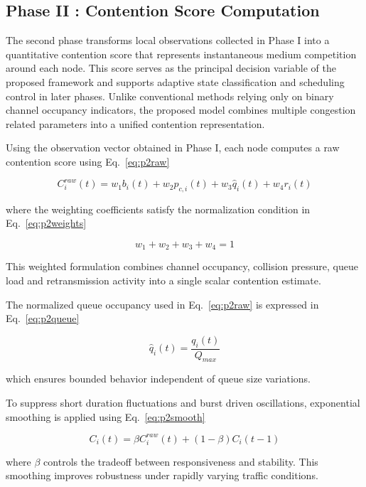 \documentclass[a4paper,fleqn,final,1p]{cas-dc}
\numberwithin{equation}{section}
\begin{document}
\subsection{Phase II : Contention Score Computation}

The second phase transforms local observations collected in Phase I into a quantitative contention score that represents instantaneous medium competition around each node. This score serves as the principal decision variable of the proposed framework and supports adaptive state classification and scheduling control in later phases. Unlike conventional methods relying only on binary channel occupancy indicators, the proposed model combines multiple congestion related parameters into a unified contention representation.

Using the observation vector obtained in Phase I, each node computes a raw contention score using Eq.~\ref{eq:p2raw}

\begin{equation}
C_i^{raw}(t)=
w_1 b_i(t)+
w_2 p_{c,i}(t)+
w_3 \hat q_i(t)+
w_4 r_i(t)
\label{eq:p2raw}
\end{equation}

where the weighting coefficients satisfy the normalization condition in Eq.~\ref{eq:p2weights}

\begin{equation}
w_1+w_2+w_3+w_4=1
\label{eq:p2weights}
\end{equation}

This weighted formulation combines channel occupancy, collision pressure, queue load and retransmission activity into a single scalar contention estimate.

The normalized queue occupancy used in Eq.~\ref{eq:p2raw} is expressed in Eq.~\ref{eq:p2queue}

\begin{equation}
\hat q_i(t)=
\frac{q_i(t)}{Q_{max}}
\label{eq:p2queue}
\end{equation}

which ensures bounded behavior independent of queue size variations.

To suppress short duration fluctuations and burst driven oscillations, exponential smoothing is applied using Eq.~\ref{eq:p2smooth}

\begin{equation}
C_i(t)=
\beta C_i^{raw}(t)
+
(1-\beta)C_i(t-1)
\label{eq:p2smooth}
\end{equation}

where $\beta$ controls the tradeoff between responsiveness and stability. This smoothing improves robustness under rapidly varying traffic conditions.
\end{document}
